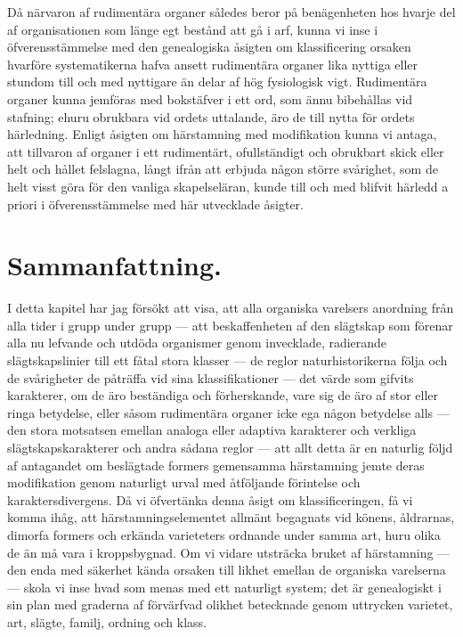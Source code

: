 Då närvaron af rudimentära organer således beror på benägenheten hos hvarje del af organisationen som länge egt bestånd att gå i arf, kunna vi inse i öfverensstämmelse med den genealogiska åsigten om klassificering orsaken hvarföre systematikerna hafva ansett rudimentära organer lika nyttiga eller stundom till och med nyttigare än delar af hög fysiologisk vigt. Rudimentära organer kunna jemföras med bokstäfver i ett ord, som ännu bibehållas vid stafning; ehuru obrukbara vid ordets uttalande, äro de till nytta för ordets härledning. Enligt åsigten om härstamning med modifikation kunna vi antaga, att tillvaron af organer i ett rudimentärt, ofullständigt och obrukbart skick eller helt och hållet felslagna, långt ifrån att erbjuda någon större svårighet, som de helt visst göra för den vanliga skapelseläran, kunde till och med blifvit härledd a priori i öfverensstämmelse med här utvecklade åsigter.



\section{Sammanfattning.}

I detta kapitel har jag försökt att visa, att alla organiska varelsers anordning från alla tider i grupp under grupp — att beskaffenheten af den slägtskap som förenar alla nu lefvande och utdöda organismer genom invecklade, radierande slägtskapslinier till ett fåtal stora klasser — de reglor naturhistorikerna följa och de svårigheter de påträffa vid sina klassifikationer — det värde som gifvits karakterer, om de äro beständiga och förherskande, vare sig de äro af stor eller ringa betydelse, eller såsom rudimentära organer icke ega någon betydelse alls — den stora motsatsen emellan analoga eller adaptiva karakterer och verkliga slägtskapskarakterer och andra sådana reglor — att allt detta är en naturlig följd af antagandet om beslägtade formers gemensamma härstamning jemte deras modifikation genom naturligt urval med åtföljande förintelse och karaktersdivergens. Då vi öfvertänka denna åsigt om klassificeringen, få vi komma ihåg, att härstamningselementet allmänt begagnats vid könens, åldrarnas, dimorfa formers och erkända varieteters ordnande under samma art, huru olika de än må vara i kroppsbygnad. Om vi vidare utsträcka bruket af härstamning — den enda med säkerhet kända orsaken till likhet emellan de organiska varelserna — skola vi inse hvad som menas med ett naturligt system; det är genealogiskt i sin plan med graderna af förvärfvad olikhet betecknade genom uttrycken varietet, art, slägte, familj, ordning och klass.

